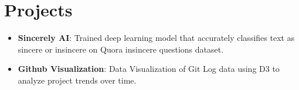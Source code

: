 \documentclass[letterpaper,11pt]{article}
\newcommand{\resumeItem}[2]{
  \item\small{
    \textbf{#1}{: #2 \vspace{-2pt}}
  }
}
\newcommand{\resumeSubItem}[2]{\resumeItem{#1}{#2}\vspace{-4pt}}
\newcommand{\resumeSubHeadingListStart}{\begin{itemize}[leftmargin=*]}
\newcommand{\resumeSubHeadingListEnd}{\end{itemize}}
\begin{document}
\section{Projects}
\resumeSubHeadingListStart
  \resumeSubItem{Sincerely AI}
    {Trained deep learning model that accurately classifies text as sincere or insincere on Quora insincere
    questions dataset.}
  \resumeSubItem{Github Visualization}
    {Data Visualization of Git Log data using D3 to analyze project trends over time.}
\resumeSubHeadingListEnd



\end{document}
